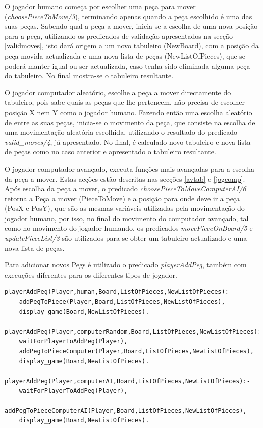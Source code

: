 \documentclass[paper=a4, fontsize=11pt]{scrartcl} %
\numberwithin{equation}{section} %
\numberwithin{figure}{section} %
\numberwithin{table}{section} %
\begin{document}
O jogador humano começa por escolher uma peça para mover (\textit{choosePieceToMove/3}), terminando apenas quando a peça escolhido é uma das suas peças. Sabendo qual a peça a mover, inicia-se a escolha de uma nova posição para a peça, utilizando os predicados de validação apresentados na secção \ref{validmoves}, isto dará origem a um novo tabuleiro (NewBoard), com a posição da peça movida actualizada e uma nova lista de peças (NewListOfPieces), que se poderá manter igual ou ser actualizada, caso tenha sido eliminada alguma peça do tabuleiro. No final mostra-se o tabuleiro resultante.

O jogador computador aleatório, escolhe a peça a mover directamente do tabuleiro, pois sabe quais as peças que lhe pertencem, não precisa de escolher posição X nem Y como o jogador humano. Fazendo então uma escolha aleatório de entre as suas peças, inicia-se o movimento da peça, que consiste na escolha de uma movimentação aleatória escolhida, utilizando o resultado do predicado \textit{valid\_moves/4}, já apresentado. No final, é calculado novo tabuleiro e nova lista de peças como no caso anterior e apresentado o tabuleiro resultante.

O jogador computador avançado, executa funções mais avançadas para a escolha da peça a mover. Estas acções estão descritas nas secções \ref{avtab} e \ref{jogcomp}. Após escolha da peça a mover, o predicado \textit{choosePieceToMoveComputerAI/6} retorna a Peça a mover (PieceToMove) e a posição para onde deve ir a peça (PosX e PosY), que são as mesmas variáveis utilizadas pela movimentação do jogador humano, por isso, no final do movimento do computador avançado, tal como no movimento do jogador humando, os predicados \textit{movePieceOnBoard/5} e \textit{updatePieceList/3} são utilizados para se obter um tabuleiro actualizado e uma nova lista de peças.

Para adicionar novos Pegs é utilizado o predicado \textit{playerAddPeg}, também com execuções diferentes para os diferentes tipos de jogador.

\begin{lstlisting}
playerAddPeg(Player,human,Board,ListOfPieces,NewListOfPieces):-
	addPegToPiece(Player,Board,ListOfPieces,NewListOfPieces),
	display_game(Board,NewListOfPieces).

playerAddPeg(Player,computerRandom,Board,ListOfPieces,NewListOfPieces):-
	waitForPlayerToAddPeg(Player),
	addPegToPieceComputer(Player,Board,ListOfPieces,NewListOfPieces),
	display_game(Board,NewListOfPieces).

playerAddPeg(Player,computerAI,Board,ListOfPieces,NewListOfPieces):-
	waitForPlayerToAddPeg(Player),
	addPegToPieceComputerAI(Player,Board,ListOfPieces,NewListOfPieces),
	display_game(Board,NewListOfPieces).
\end{lstlisting}
\end{document}
